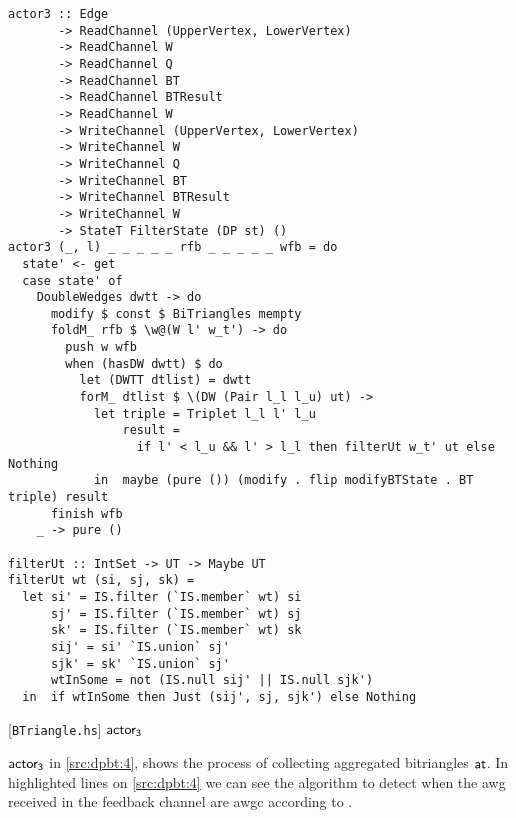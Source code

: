 \begin{listing}[htp!]
\begin{verbatim}      
actor3 :: Edge
       -> ReadChannel (UpperVertex, LowerVertex)
       -> ReadChannel W
       -> ReadChannel Q
       -> ReadChannel BT
       -> ReadChannel BTResult
       -> ReadChannel W
       -> WriteChannel (UpperVertex, LowerVertex)
       -> WriteChannel W
       -> WriteChannel Q
       -> WriteChannel BT
       -> WriteChannel BTResult
       -> WriteChannel W
       -> StateT FilterState (DP st) ()
actor3 (_, l) _ _ _ _ _ rfb _ _ _ _ _ wfb = do
  state' <- get
  case state' of
    DoubleWedges dwtt -> do
      modify $ const $ BiTriangles mempty
      foldM_ rfb $ \w@(W l' w_t') -> do
        push w wfb
        when (hasDW dwtt) $ do
          let (DWTT dtlist) = dwtt
          forM_ dtlist $ \(DW (Pair l_l l_u) ut) ->
            let triple = Triplet l_l l' l_u
                result =
                  if l' < l_u && l' > l_l then filterUt w_t' ut else Nothing
            in  maybe (pure ()) (modify . flip modifyBTState . BT triple) result
      finish wfb
    _ -> pure ()

filterUt :: IntSet -> UT -> Maybe UT
filterUt wt (si, sj, sk) =
  let si' = IS.filter (`IS.member` wt) si 
      sj' = IS.filter (`IS.member` wt) sj
      sk' = IS.filter (`IS.member` wt) sk
      sij' = si' `IS.union` sj'
      sjk' = sk' `IS.union` sj'
      wtInSome = not (IS.null sij' || IS.null sjk')
  in  if wtInSome then Just (sij', sj, sjk') else Nothing
\end{verbatim}
\caption{[\texttt{BTriangle.hs}] $\ac$}
\label{src:dpbt:4}
\end{listing}

$\mathsf{actor_3}$ in \autoref{src:dpbt:4}, shows the process of collecting aggregated bitriangles $\mathsf{at}$. In highlighted lines on \autoref{src:dpbt:4} we can see the algorithm to detect when the \acrshort{awg}
received in the feedback channel are \acrshort{awgc} according to .

